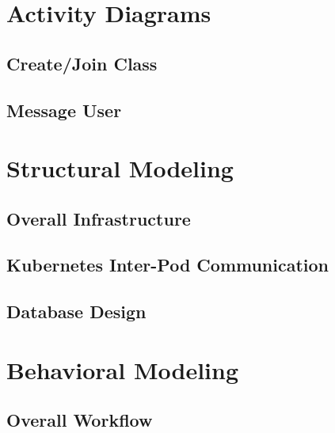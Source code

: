 \documentclass[12pt]{article}
\begin{document}
\begin{titlepage}
    \maketitle
    \thispagestyle{firstpage}
\end{titlepage}

\section{Activity Diagrams}
    \subsection{Create/Join Class}

    \subsection{Message User}

\section{Structural Modeling}
    \subsection{Overall Infrastructure}

    \subsection{Kubernetes Inter-Pod Communication}

    \subsection{Database Design}

\section{Behavioral Modeling}

    \subsection{Overall Workflow}
\end{document}
